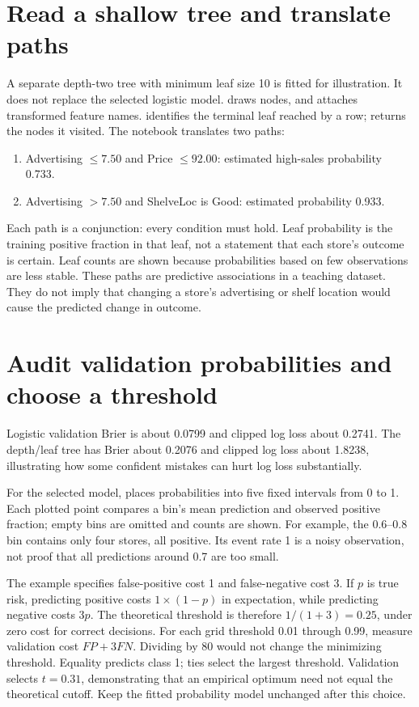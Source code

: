\section{Read a shallow tree and translate paths}
A separate depth-two tree with minimum leaf size 10 is fitted for illustration. It does not replace the selected logistic model.  draws nodes, and  attaches transformed feature names.
 identifies the terminal leaf reached by a row;  returns the nodes it visited. The notebook translates two paths:
\begin{enumerate}
\item Advertising $\le7.50$ and Price $\le92.00$: estimated high-sales probability 0.733.
\item Advertising $>7.50$ and ShelveLoc is Good: estimated probability 0.933.
\end{enumerate}
Each path is a conjunction: every condition must hold. Leaf probability is the training positive fraction in that leaf, not a statement that each store's outcome is certain. Leaf counts are shown because probabilities based on few observations are less stable.
These paths are predictive associations in a teaching dataset. They do not imply that changing a store's advertising or shelf location would cause the predicted change in outcome.

\section{Audit validation probabilities and choose a threshold}
Logistic validation Brier is about 0.0799 and clipped log loss about 0.2741. The depth/leaf tree has Brier about 0.2076 and clipped log loss about 1.8238, illustrating how some confident mistakes can hurt log loss substantially.

For the selected model,  places probabilities into five fixed intervals from 0 to 1. Each plotted point compares a bin's mean prediction and observed positive fraction; empty bins are omitted and counts are shown. For example, the 0.6--0.8 bin contains only four stores, all positive. Its event rate 1 is a noisy observation, not proof that all predictions around 0.7 are too small.

The example specifies false-positive cost 1 and false-negative cost 3. If $p$ is true risk, predicting positive costs $1\times(1-p)$ in expectation, while predicting negative costs $3p$. The theoretical threshold is therefore $1/(1+3)=0.25$, under zero cost for correct decisions.
For each grid threshold 0.01 through 0.99, measure validation cost $FP+3FN$. Dividing by 80 would not change the minimizing threshold. Equality predicts class 1; ties select the largest threshold. Validation selects $t=0.31$, demonstrating that an empirical optimum need not equal the theoretical cutoff. Keep the fitted probability model unchanged after this choice.

